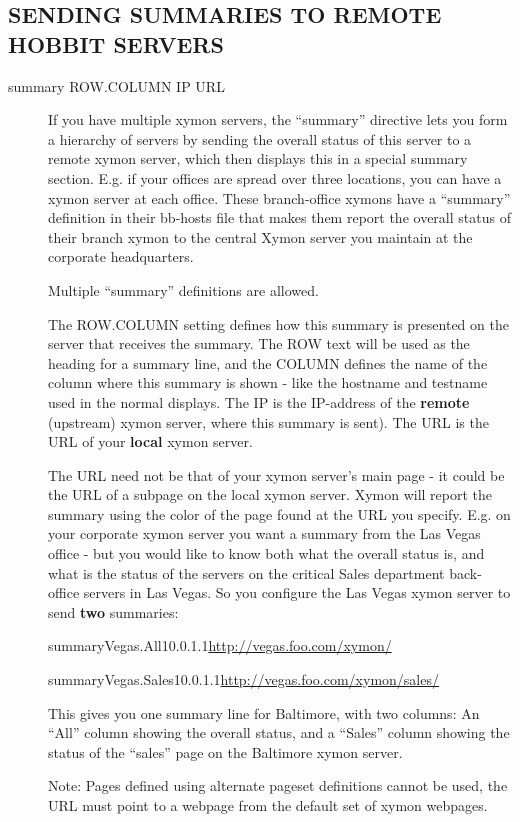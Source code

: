  
\subsection{SENDING SUMMARIES TO REMOTE HOBBIT SERVERS}
\begin{description}
\item[summary ROW.COLUMN IP URL] If you have multiple xymon servers,
  the ``summary'' directive lets you form a hierarchy of servers by
  sending the overall status of this server to a remote xymon server,
  which then displays this in a special summary section. E.g. if your
  offices are spread over three locations, you can have a xymon
  server at each office. These branch-office xymons have a
  ``summary'' definition in their bb-hosts file that makes them report
  the overall status of their branch xymon to the central Xymon
  server you maintain at the corporate headquarters. 


  Multiple ``summary'' definitions are allowed. 


  The ROW.COLUMN setting defines how this summary is presented on the
  server that receives the summary. The ROW text will be used as the
  heading for a summary line, and the COLUMN defines the name of the
  column where this summary is shown - like the hostname and testname
  used in the normal displays. The IP is the IP-address of the
  \textbf{remote} (upstream) xymon server, where this summary is
  sent). The URL is the URL of your \textbf{local} xymon server. 



  The URL need not be that of your xymon server's main page - it
  could be the URL of a subpage on the local xymon server. Xymon
  will report the summary using the color of the page found at the URL
  you specify. E.g. on your corporate xymon server you want a summary
  from the Las Vegas office - but you would like to know both what the
  overall status is, and what is the status of the servers on the
  critical Sales department back-office servers in Las Vegas. So you
  configure the Las Vegas xymon server to send \textbf{two}
  summaries: 





  
summaryVegas.All10.0.1.1\url{http://vegas.foo.com/xymon/} 
 
summaryVegas.Sales10.0.1.1\url{http://vegas.foo.com/xymon/sales/}


 


  This gives you one summary line for Baltimore, with two columns: An
  ``All'' column showing the overall status, and a ``Sales'' column
  showing the status of the ``sales'' page on the Baltimore xymon
  server. 



  Note: Pages defined using alternate pageset definitions cannot be
  used, the URL must point to a webpage from the default set of xymon
  webpages. 



 


\end{description}
